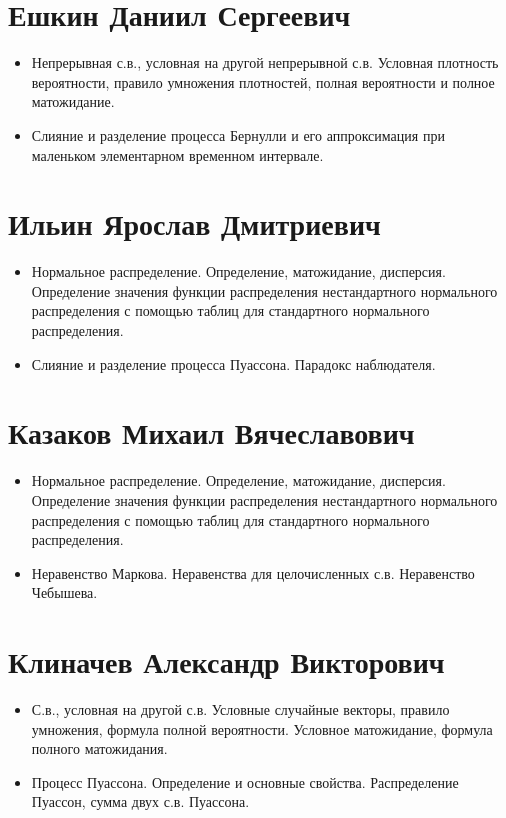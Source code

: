 \documentclass[12pt]{article}
\begin{document}
\section{Ешкин Даниил Сергеевич}

\begin{itemize}
  \item Непрерывная с.в., условная на другой непрерывной с.в. Условная плотность вероятности, правило умножения плотностей, полная вероятности и полное матожидание.
  \item Слияние и разделение процесса Бернулли и его аппроксимация при маленьком элементарном временном интервале.
\end{itemize}

\section{Ильин Ярослав Дмитриевич}

\begin{itemize}
  \item Нормальное распределение. Определение, матожидание, дисперсия. Определение значения функции распределения нестандартного нормального распределения с помощью таблиц для стандартного нормального распределения.
  \item Слияние и разделение процесса Пуассона. Парадокс наблюдателя.
\end{itemize}

\section{Казаков Михаил Вячеславович}

\begin{itemize}
  \item Нормальное распределение. Определение, матожидание, дисперсия. Определение значения функции распределения нестандартного нормального распределения с помощью таблиц для стандартного нормального распределения.
  \item Неравенство Маркова. Неравенства для целочисленных с.в. Неравенство Чебышева.
\end{itemize}

\section{Клиначев Александр Викторович}

\begin{itemize}
  \item С.в., условная на другой с.в. Условные случайные векторы, правило умножения, формула полной вероятности. Условное матожидание, формула полного матожидания.
  \item Процесс Пуассона. Определение и основные свойства. Распределение Пуассон, сумма двух с.в. Пуассона.
\end{itemize}
\end{document}
